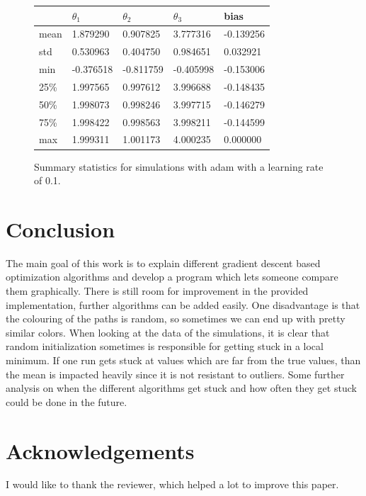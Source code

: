 \documentclass[aodsor,preprint]{imsart}
\numberwithin{equation}{section}
\theoremstyle{plain}
\begin{document}
\begin{figure}
\centering
\begin{tabular}{l|llll}
 &  $\theta_{1}$ &  $\theta_{2}$ &  $\theta_{3}$ & bias \\ \hline
mean  &  1.879290 & 0.907825 & 3.777316 & -0.139256\\
std   &  0.530963 & 0.404750 & 0.984651 & 0.032921\\
min   & -0.376518 & -0.811759 & -0.405998 & -0.153006\\
25\%   & 1.997565 &  0.997612 & 3.996688 & -0.148435\\
50\%   & 1.998073 &  0.998246 & 3.997715 & -0.146279\\
75\%   & 1.998422 &  0.998563 & 3.998211 & -0.144599\\
max   & 1.999311 &  1.001173 & 4.000235 & 0.000000\\
\end{tabular}
\caption{Summary statistics for simulations with adam with a learning rate of 0.1.}
\label{fig:sumstat2}
\end{figure}

\section{Conclusion}
The main goal of this work is to explain different gradient descent based optimization algorithms and develop a program which lets someone compare them graphically. There is still room for improvement in the provided implementation, further algorithms can be added easily. One disadvantage is that the colouring of the paths is random, so sometimes we can end up with pretty similar colors. When looking at the data of the simulations, it is clear that random initialization sometimes is responsible for getting stuck in a local minimum. If one run gets stuck at values which are far from the true values, than the mean is impacted heavily since it is not resistant to outliers. Some further analysis on when the different algorithms get stuck and how often they get stuck could be done in the future.


\section{Acknowledgements}
I would like to thank the reviewer, which helped a lot to improve this paper.


{}
\end{document}
